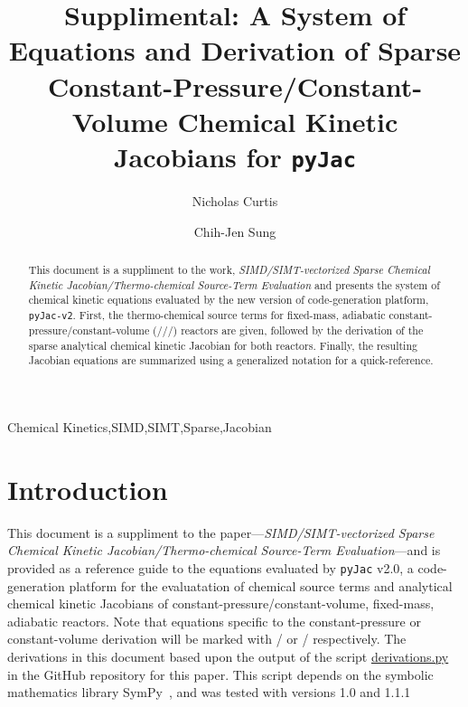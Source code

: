 \documentclass[12pt,number,sort&compress]{elsarticle}
\title{Supplimental: A System of Equations and Derivation of Sparse Constant-Pressure\slash Constant-Volume Chemical Kinetic Jacobians for \texttt{pyJac}}
\author[1]{Nicholas Curtis\corref{corr}}
\author[1]{Chih-Jen Sung}
\begin{document}
\begin{frontmatter}

\begin{abstract} %
This document is a suppliment to the work, \textit{SIMD\slash SIMT-vectorized Sparse Chemical Kinetic Jacobian\slash Thermo-chemical Source-Term Evaluation} and presents the system of chemical kinetic equations evaluated by the new version of code-generation platform, \texttt{pyJac-v2}.
First, the thermo-chemical source terms for fixed-mass, adiabatic constant-pressure\slash constant-volume (\conp/\slash\conv/) reactors are given, followed by the derivation of the sparse analytical chemical kinetic Jacobian for both reactors.
Finally, the resulting Jacobian equations are summarized using a generalized notation for a quick-reference.
\end{abstract}

\begin{keyword}
    Chemical Kinetics\sep SIMD\sep SIMT\sep Sparse\sep Jacobian
\end{keyword}

\end{frontmatter}

\section{Introduction}
This document is a suppliment to the paper---\textit{SIMD\slash SIMT-vectorized Sparse Chemical Kinetic Jacobian\slash Thermo-chemical Source-Term Evaluation}---and is provided as a reference guide to the equations evaluated by \texttt{pyJac} v2.0, a code-generation platform for the evaluatation of chemical source terms and analytical chemical kinetic Jacobians of constant-pressure\slash constant-volume, fixed-mass, adiabatic reactors.
Note that equations specific to the constant-pressure or constant-volume derivation will be marked with \conp/ or \conv/ respectively.
The derivations in this document based upon the output of the script \href{https://github.com/arghdos/SPyJac-paper/blob/master/derivations/scripts/derivations.py}{derivations.py} in the GitHub repository for this paper.
This script depends on the symbolic mathematics library SymPy~\cite{sympy}, and was tested with versions 1.0 and 1.1.1
\end{document}
